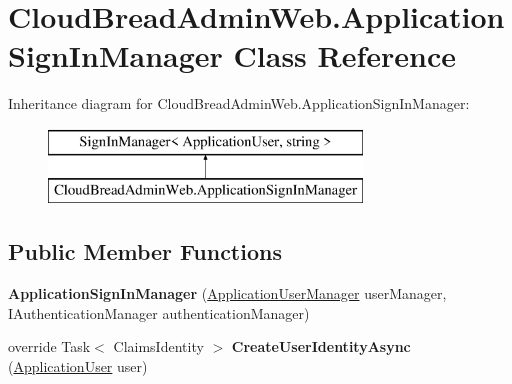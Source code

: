 \hypertarget{class_cloud_bread_admin_web_1_1_application_sign_in_manager}{}\section{Cloud\+Bread\+Admin\+Web.\+Application\+Sign\+In\+Manager Class Reference}
\label{class_cloud_bread_admin_web_1_1_application_sign_in_manager}
Inheritance diagram for Cloud\+Bread\+Admin\+Web.\+Application\+Sign\+In\+Manager\+:\begin{figure}[H]
\begin{center}
\leavevmode
\includegraphics[height=2.000000cm]{class_cloud_bread_admin_web_1_1_application_sign_in_manager}
\end{center}
\end{figure}
\subsection*{Public Member Functions}
\begin{DoxyCompactItemize}
\item 
{\bfseries Application\+Sign\+In\+Manager} (\hyperlink{class_cloud_bread_admin_web_1_1_application_user_manager}{Application\+User\+Manager} user\+Manager, I\+Authentication\+Manager authentication\+Manager)\hypertarget{class_cloud_bread_admin_web_1_1_application_sign_in_manager_a2123b819dffedb29dbcd98a178dd12b5}{}\label{class_cloud_bread_admin_web_1_1_application_sign_in_manager_a2123b819dffedb29dbcd98a178dd12b5}

\item 
override Task$<$ Claims\+Identity $>$ {\bfseries Create\+User\+Identity\+Async} (\hyperlink{class_cloud_bread_admin_web_1_1_models_1_1_application_user}{Application\+User} user)\hypertarget{class_cloud_bread_admin_web_1_1_application_sign_in_manager_aa54573a171c3e9e11f973b8e4ef01485}{}\label{class_cloud_bread_admin_web_1_1_application_sign_in_manager_aa54573a171c3e9e11f973b8e4ef01485}

\end{DoxyCompactItemize}
